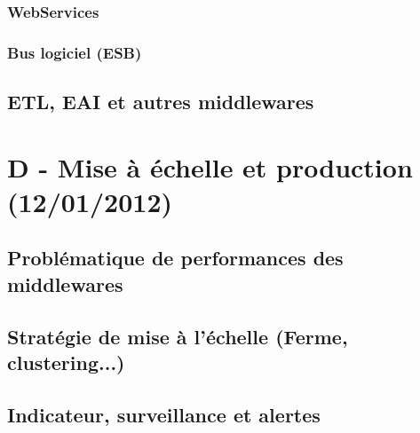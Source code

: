\subsubsection{WebServices}

\subsubsection{Bus logiciel (ESB)}
\subsection{ETL, EAI et autres middlewares}

\section{D - Mise à échelle et production (12/01/2012)}

\subsection{Problématique de performances des middlewares}

\subsection{Stratégie de mise à l'échelle (Ferme, clustering...)}

\subsection{Indicateur, surveillance et alertes}



